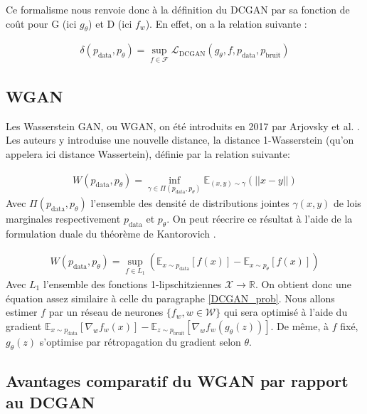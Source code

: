 Ce formalisme nous renvoie donc à la définition du DCGAN par sa fonction de coût pour G (ici $g_{\theta}$) et D (ici $f_{w}$). En effet, on a la relation suivante : 

$$\begin{aligned}
\delta(p_{\mathrm{data}}, p_{\theta}) = \sup_{f\in\mathcal{F}} \mathcal{L}_{\mathrm{DCGAN}}(g_{\theta}, f, p_{\mathrm{data}},  p_{\mathrm{bruit}})
\end{aligned}$$

\subsection{WGAN} \label{WGAN}

Les Wasserstein GAN, ou WGAN, on été introduits en 2017 par Arjovsky et al. \cite{arjovsky_wasserstein_2017}. Les auteurs y introduise une nouvelle distance, la distance 1-Wasserstein (qu'on appelera ici distance Wassertein), définie par la relation suivante:

$$\begin{aligned}
W(p_{\mathrm{data}}, p_{\theta}) = \inf_{\gamma \in \Pi (p_{\mathrm{data}}, p_{\theta})} \mathbb{E}_{(x, y) \sim \gamma} (||x - y||)
\end{aligned}$$
Avec $\Pi (p_{\mathrm{data}}, p_{\theta})$ l'ensemble des densité de distributions jointes $\gamma (x, y)$ de lois marginales respectivement $p_{\mathrm{data}}$ et $p_{\theta}$. On peut réecrire ce résultat à l'aide de la formulation duale du théorème de Kantorovich \cite{villani_optimal_2006}.


$$\begin{aligned}
W(p_{\mathrm{data}}, p_{\theta}) = \sup_{f \in L_{1}}\left(\mathbb{E}_{x\sim p_{\mathrm{data}}} [f(x)] - \mathbb{E}_{x\sim p_{\theta}} [f(x)]\right)
\end{aligned}$$
 Avec $L_{1}$ l'ensemble des fonctions 1-lipschitziennes $\mathcal{X} \longrightarrow \mathbb{R}$. On obtient donc une équation assez similaire à celle du paragraphe \ref{DCGAN_prob}. Nous allons estimer $f$ par un réseau de neurones $\{f_{w}, w \in \mathcal{W} \}$ qui sera optimisé à l'aide du gradient $\mathbb{E}_{x\sim p_{\mathrm{data}}} \left[\nabla_{w}f_{w}(x)\right] - \mathbb{E}_{z\sim p_{\mathrm{bruit}}} \left[\nabla_{w}f_{w}(g_{\theta}(z))\right]$. De même, à $f$ fixé, $g_{\theta}(z)$ s'optimise par rétropagation du gradient selon $\theta$.
 
 \subsection{Avantages comparatif du WGAN par rapport au DCGAN}
 
